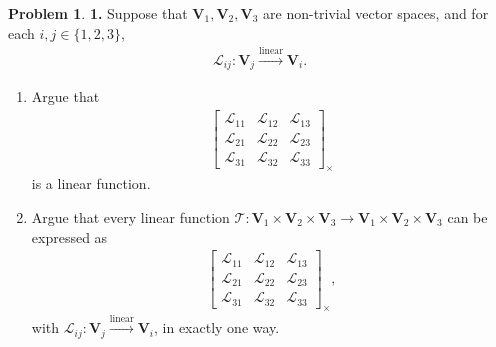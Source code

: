 \documentclass{article}
\theoremstyle{definition}
\newtheorem*{prob*}{Problem}
\newcommand{\V}{\mathbf{V}}
\newcommand{\lag}{\mathcal{L}}
\newcommand{\T}{\mathcal{T}}
\begin{document}
\begin{prob*}\textbf{1.} Suppose that $\V_1, \V_2, \V_3$ are non-trivial vector spaces, and for each $i,j \in \{ 1,2,3\}$,
	\begin{align*}
	\lag_{ij} : \V_j \overset{\text{linear}}{\longrightarrow} \V_i.
	\end{align*}
	\begin{enumerate}
		\item Argue that 
		\begin{align*}
		\begin{bmatrix}
		\lag_{11} & \lag_{12} & \lag_{13}\\
		\lag_{21} & \lag_{22} & \lag_{23}\\
		\lag_{31} & \lag_{32} & \lag_{33}
		\end{bmatrix}_\times
		\end{align*}
		is a linear function.\\
		
		
		
		
		
		
		
		
		
		

		
		\item Argue that every linear function $\T : \V_1 \times \V_2 \times \V_3 \to \V_1\times\V_2\times \V_3$ can be expressed as 
		\begin{align*} 
		\begin{bmatrix}
		\lag_{11} & \lag_{12} & \lag_{13}\\
		\lag_{21} & \lag_{22} & \lag_{23}\\
		\lag_{31} & \lag_{32} & \lag_{33} 
		\end{bmatrix}_\times,
		\end{align*} 
		with $\lag_{ij} : \V_j \overset{\text{linear}}{\longrightarrow} \V_i$, in exactly one way. \\
		

\end{enumerate}
\end{prob*}
\end{document}
